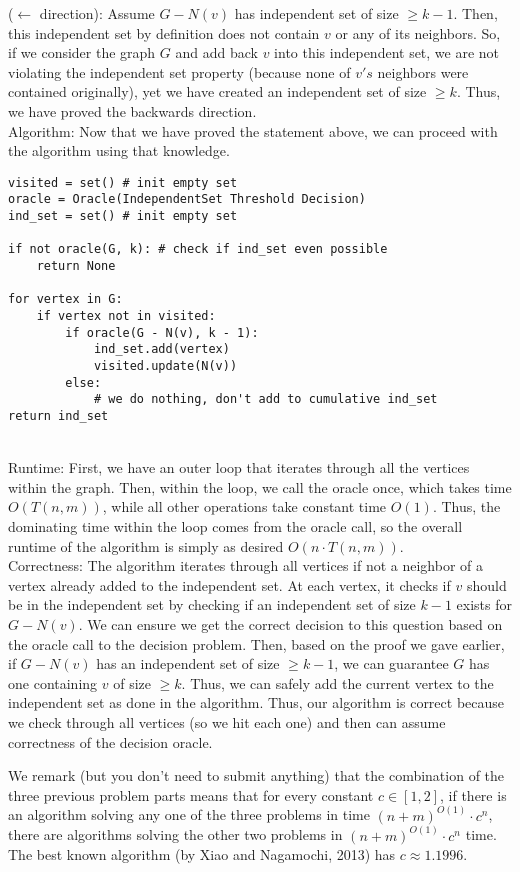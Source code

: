 \documentclass[11pt]{article}
\begin{document}
\begin{enumerate}
\begin{enumerate}
($\longleftarrow$ direction): Assume $G - N(v)$ has independent set of size $\geq k - 1$. Then, this independent set by definition does not contain $v$ or any of its neighbors. So, if we consider the graph $G$ and add back $v$ into this independent set, we are not violating the independent set property (because none of $v's$ neighbors were contained originally), yet we have created an independent set of size $\geq k$. Thus, we have proved the backwards direction. \\

Algorithm: Now that we have proved the statement above, we can proceed with the algorithm using that knowledge. 

\begin{lstlisting}
visited = set() # init empty set
oracle = Oracle(IndependentSet Threshold Decision)
ind_set = set() # init empty set

if not oracle(G, k): # check if ind_set even possible
    return None 

for vertex in G:
    if vertex not in visited:
        if oracle(G - N(v), k - 1):
            ind_set.add(vertex)
            visited.update(N(v))
        else: 
            # we do nothing, don't add to cumulative ind_set
return ind_set
\end{lstlisting}\\

Runtime: First, we have an outer loop that iterates through all the vertices within the graph. Then, within the loop, we call the oracle once, which takes time $O(T(n, m))$, while all other operations take constant time $O(1)$. Thus, the dominating time within the loop comes from the oracle call, so the overall runtime of the algorithm is simply as desired $O(n\cdot T(n,m))$. \\

Correctness: The algorithm iterates through all vertices if not a neighbor of a vertex already added to the independent set. At each vertex, it checks if $v$ should be in the independent set by checking if an independent set of size $k-1$ exists for $G - N(v)$. We can ensure we get the correct decision to this question based on the oracle call to the decision problem. Then, based on the proof we gave earlier, if $G - N(v)$ has an independent set of size $ \geq k-1$, we can guarantee $G$ has one containing $v$ of size $\geq k$. Thus, we can safely add the current vertex to the independent set as done in the algorithm. Thus, our algorithm is correct because we check through all vertices (so we hit each one) and then can assume correctness of the decision oracle. 
 \end{enumerate}
 We remark (but you don't need to submit anything) that the combination of the three previous problem parts means that for every constant $c\in [1,2]$, if there is an algorithm solving any one of the three problems in time $(n+m)^{O(1)}\cdot c^n$, there are algorithms solving the other two problems in $(n+m)^{O(1)}\cdot c^n$ time.  The best known algorithm (by Xiao and Nagamochi, 2013) has $c \approx 1.1996$.
 
\end{enumerate}
\end{document}

